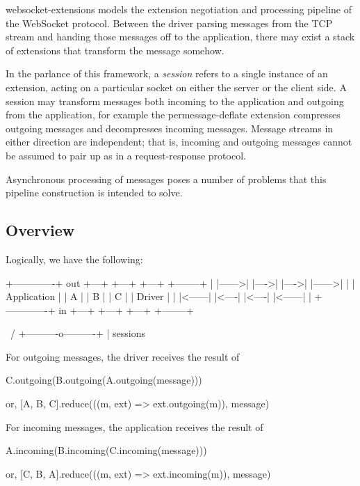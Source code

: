 {\ttfamily websocket-\/extensions} models the extension negotiation and processing pipeline of the Web\+Socket protocol. Between the driver parsing messages from the T\+CP stream and handing those messages off to the application, there may exist a stack of extensions that transform the message somehow.

In the parlance of this framework, a {\itshape session} refers to a single instance of an extension, acting on a particular socket on either the server or the client side. A session may transform messages both incoming to the application and outgoing from the application, for example the {\ttfamily permessage-\/deflate} extension compresses outgoing messages and decompresses incoming messages. Message streams in either direction are independent; that is, incoming and outgoing messages cannot be assumed to \textquotesingle{}pair up\textquotesingle{} as in a request-\/response protocol.

Asynchronous processing of messages poses a number of problems that this pipeline construction is intended to solve.

\subsection*{Overview}

Logically, we have the following\+:

\begin{DoxyVerb}+-------------+  out  +---+     +---+     +---+       +--------+
|             |------>|   |---->|   |---->|   |------>|        |
| Application |       | A |     | B |     | C |       | Driver |
|             |<------|   |<----|   |<----|   |<------|        |
+-------------+  in   +---+     +---+     +---+       +--------+

                      \                       /
                       +----------o----------+
                                  |
                               sessions
\end{DoxyVerb}


For outgoing messages, the driver receives the result of \begin{DoxyVerb}    C.outgoing(B.outgoing(A.outgoing(message)))

or, [A, B, C].reduce(((m, ext) => ext.outgoing(m)), message)
\end{DoxyVerb}


For incoming messages, the application receives the result of \begin{DoxyVerb}    A.incoming(B.incoming(C.incoming(message)))

or, [C, B, A].reduce(((m, ext) => ext.incoming(m)), message)
\end{DoxyVerb}


